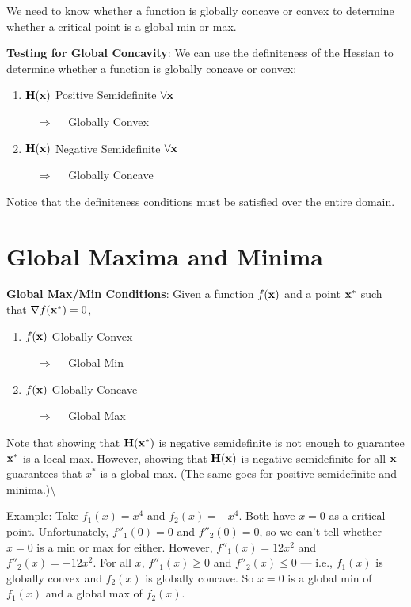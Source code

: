 \documentclass[]{book}
\newcommand{\fx}{f({\bf x})}
\theoremstyle{definition}
\theoremstyle{definition}
\theoremstyle{definition}
\theoremstyle{remark}
\begin{document}
We need to know whether a function is globally concave or convex to
determine whether a critical point is a global min or max.

\textbf{Testing for Global Concavity}: We can use the definiteness of
the Hessian to determine whether a function is globally concave or
convex:

\begin{enumerate}
        \item \parbox[t]{2.3in}{$\bf H(x)$ Positive Semidefinite 
        $\forall {\bf x}$} $\quad \Longrightarrow \quad$ Globally Convex
         \item \parbox[t]{2.3in}{$\bf H(x)$ Negative Semidefinite 
         $\forall {\bf x}$} $\quad \Longrightarrow \quad$ Globally 
         Concave
\end{enumerate}

Notice that the definiteness conditions must be satisfied over the
entire domain.

\section{Global Maxima and Minima}\label{global-maxima-and-minima}

\textbf{Global Max/Min Conditions}: Given a function \(\fx\) and a point
\({\bf x}^*\) such that \(\nabla f({\bf x}^*)=0\),

\begin{enumerate}
  \item \parbox[t]{2in}{$\fx$ Globally Convex} $\quad
\Longrightarrow \quad$ Global Min
  \item \parbox[t]{2in}{$\fx$ Globally Concave} $\quad
\Longrightarrow \quad$ Global Max
\end{enumerate}

Note that showing that \(\bf H(x^*)\) is negative semidefinite is not
enough to guarantee \({\bf x}^*\) is a local max. However, showing that
\(\bf H(x)\) is negative semidefinite for all \({\bf x}\) guarantees
that \(x^*\) is a global max. (The same goes for positive semidefinite
and minima.)\textbackslash{}

Example: Take \(f_1(x)=x^4\) and \(f_2(x)=-x^4\). Both have \(x=0\) as a
critical point. Unfortunately, \(f''_1(0)=0\) and \(f''_2(0)=0\), so we
can't tell whether \(x=0\) is a min or max for either. However,
\(f''_1(x)=12x^2\) and \(f''_2(x)=-12x^2\). For all \(x\),
\(f''_1(x)\ge 0\) and \(f''_2(x)\le 0\) --- i.e., \(f_1(x)\) is globally
convex and \(f_2(x)\) is globally concave. So \(x=0\) is a global min of
\(f_1(x)\) and a global max of \(f_2(x)\).
\end{document}
